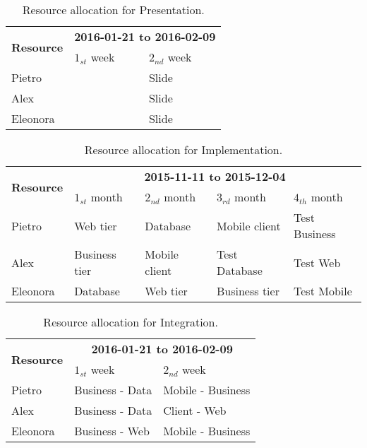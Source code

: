 \begin{table}[h]
    \centering
    \begin{tabular}{| l | l | l |}
        \hline
        \multirow{2}{*}{\textbf{Resource}} & \multicolumn{2}{c|}{\textbf{2016-01-21 to 2016-02-09}} \\
        \cline{2-3}
        & $1_{st}$ week & $2_{nd}$ week \\
        \hline
        Pietro        &     & Slide      \\
        Alex         &     & Slide    \\
        Eleonora        &     & Slide    \\
        \hline
    \end{tabular}
    \caption{Resource allocation for Presentation.}
    \label{tab:presentation-alloc}
\end{table}


\begin{table}[h]
    \centering
    \begin{tabular}{| l | l | l | l | l |}
        \hline
        \multirow{2}{*}{\textbf{Resource}} & \multicolumn{4}{c|}{\textbf{2015-11-11 to 2015-12-04}} \\
        \cline{2-5}
        & $1_{st}$ month & $2_{nd}$ month & $3_{rd} $ month & $4_{th}$ month\\
        \hline
        Pietro        & Web tier    & Database     & Mobile client & Test Business    \\
        Alex         & Business tier     & Mobile client     & Test Database & Test Web   \\
        Eleonora        & Database    & Web tier     & Business tier &    Test Mobile  \\
        \hline
    \end{tabular}
    \caption{Resource allocation for Implementation.}
    \label{tab:implementation-alloc}
\end{table}


\begin{table}[h]
    \centering
    \begin{tabular}{| l | l | l |}
        \hline
        \multirow{2}{*}{\textbf{Resource}} & \multicolumn{2}{c|}{\textbf{2016-01-21 to 2016-02-09}} \\
        \cline{2-3}
        & $1_{st}$ week & $2_{nd}$ week \\
        \hline
        Pietro        &   Business - Data  & Mobile - Business     \\
        Alex         &   Business - Data  & Client - Web    \\
        Eleonora        &   Business - Web  & Mobile - Business    \\
        \hline
    \end{tabular}
    \caption{Resource allocation for Integration.}
    \label{tab:int-test-alloc}
\end{table}




